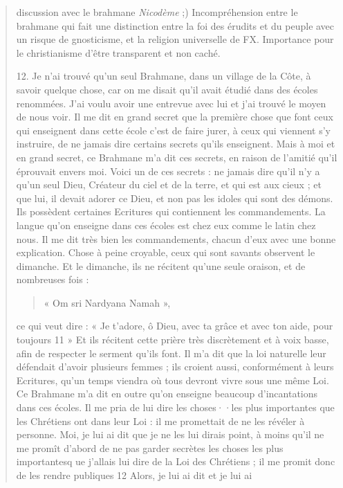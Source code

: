 \begin{quote}
\begin{Synthesis}
discussion avec le brahmane \textit{Nicodème} ;) 
Incompréhension entre le brahmane qui fait une distinction entre la foi des érudits et du peuple avec un risque de gnosticisme, et la religion universelle de FX. Importance pour le christianisme d'être transparent et non caché.
\end{Synthesis}

12. Je n'ai trouvé qu'un seul Brahmane, dans un village de la
Côte, à savoir quelque chose, car on me disait qu'il avait étudié
dans des écoles renommées. J'ai voulu avoir une entrevue avec lui
et j'ai trouvé le moyen de nous voir. Il me dit en grand secret que
la première chose que font ceux qui enseignent dans cette école
c'est de faire jurer, à ceux qui viennent s'y instruire, de ne jamais
dire certains secrets qu'ils enseignent. Mais à moi et en grand
secret, ce Brahmane m'a dit ces secrets, en raison de l'amitié qu'il
éprouvait envers moi. Voici un de ces secrets : ne jamais dire qu'il
n'y a qu'un seul Dieu, Créateur du ciel et de la terre, et qui est aux
cieux ; et que lui, il devait adorer ce Dieu, et non pas les idoles
qui sont des démons. Ils possèdent certaines Ecritures qui contiennent
les commandements. La langue qu'on enseigne dans ces écoles
est chez eux comme le latin chez nous. Il me dit très bien les
commandements, chacun d'eux avec une bonne explication. Chose
à peine croyable, ceux qui sont savants observent le dimanche. Et
le dimanche, ils ne récitent qu'une seule oraison, et de nombreuses fois : \begin{quote}
    « Om sri Nardyana Namah »,
\end{quote} ce qui veut dire : « Je
t'adore, ô Dieu, avec ta grâce et avec ton aide, pour toujours 11 »
Et ils récitent cette prière très discrètement et à voix basse, afin de
respecter le serment qu'ils font. Il m'a dit que la loi naturelle leur
défendait d'avoir plusieurs femmes ; ils croient aussi, conformément
à leurs Ecritures, qu'un temps viendra où tous devront vivre
sous une même Loi. Ce Brahmane m'a dit en outre qu'on enseigne
beaucoup d'incantations dans ces écoles.
Il me pria de lui dire les choses··les plus importantes que les Chrétiens
ont dans leur Loi : il me promettait de ne les révéler à personne.
Moi, je lui ai dit que je ne les lui dirais point, à moins qu'il
ne me promît d'abord de ne pas garder secrètes les choses les plus
importantesq ue j'allais lui dire de la Loi des Chrétiens ; il me promit
donc de les rendre publiques 12 Alors, je lui ai dit et je lui ai 

\end{quote}
